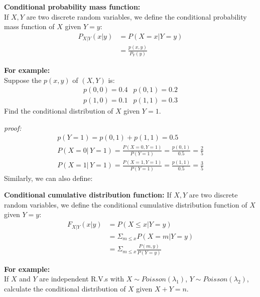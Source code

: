 \documentclass{article}
\begin{document}
\begin{definition}
    \textbf{Conditional probability mass function:}\\
    If $X,Y$ are two discrete random variables, we define the conditional probability mass function of $X$ given $Y = y$:
    \begin{align*}
        P_{X|Y}(x|y) &= P(X = x| Y = y) \\
                     &= \frac{p(x,y)}{P_Y(y)}
    \end{align*}    
\end{definition}
\textbf{For example:} \\
Suppose the $p(x,y)$ of $(X,Y)$ is:
\[
\begin{array}{rl}
    p(0,0) = 0.4 & p(0,1) = 0.2\\
    p(1,0) = 0.1 & p(1,1) = 0.3
\end{array}
\]
Find the conditional distribution of $X$ given $Y=1$.

\emph{proof:}
\[
    \begin{array}{c}
        p(Y=1) = p(0,1) + p(1,1) = 0.5\\
        P(X=0|\,Y=1) = \frac{P(X=0,Y=1)}{P(Y=1)} = \frac{p(0,1)}{0.5} = \frac{2}{5}\\
        P(X=1|\,Y=1) = \frac{P(X=1,Y=1)}{P(Y=1)} = \frac{p(1,1)}{0.5} = \frac{3}{5}
    \end{array}
\]
Similarly, we can also define:
\begin{definition}
    \textbf{Conditional cumulative distribution function:}
    If $X,Y$ are two discrete random variables, we define the conditional cumulative distribution function of $X$ given $Y = y$:
    \begin{align*}
        F_{X|Y}(x|y) &= P(X \leq x | Y = y) \\
                     &= \Sigma_{m \leq x} P(X = m| Y = y) \\
                     &= \Sigma_{m \leq x} \frac{P(m, y)}{P(Y = y)}
    \end{align*}        
\end{definition}
\textbf{For example:}\\
If $X$ and $Y$ are independent R.V.s with $X\sim Poisson(\lambda_{1})$, $Y\sim Poisson(\lambda_{2})$,
calculate the conditional distribution of $X$ given $X+Y = n$.
\end{document}
